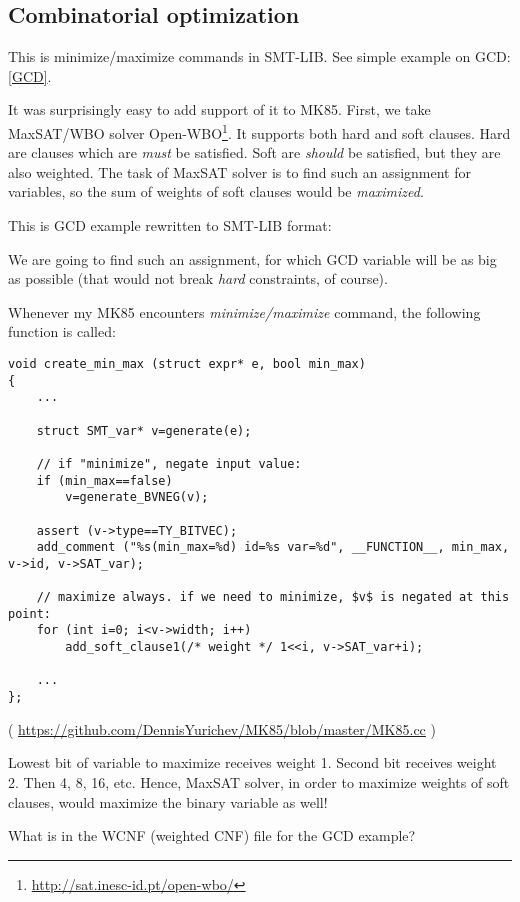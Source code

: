 \subsection{Combinatorial optimization}

This is minimize/maximize commands in SMT-LIB.
See simple example on \ac{GCD}: \ref{GCD}.

It was surprisingly easy to add support of it to MK85.
First, we take MaxSAT/WBO solver Open-WBO\footnote{\url{http://sat.inesc-id.pt/open-wbo/}}.
It supports both hard and soft clauses.
Hard are clauses which are \emph{must} be satisfied.
Soft are \emph{should} be satisfied, but they are also weighted.
The task of MaxSAT solver is to find such an assignment for variables, so the sum of weights of soft clauses would be
\emph{maximized}.

This is GCD example rewritten to SMT-LIB format:



We are going to find such an assignment, for which GCD variable will be as big as possible
(that would not break \emph{hard} constraints, of course).

Whenever my MK85 encounters \emph{minimize/maximize} command, the following function is called:

\begin{lstlisting}[style=customc]
void create_min_max (struct expr* e, bool min_max)
{
	...

	struct SMT_var* v=generate(e);

	// if "minimize", negate input value:
	if (min_max==false)
		v=generate_BVNEG(v);

	assert (v->type==TY_BITVEC);
	add_comment ("%s(min_max=%d) id=%s var=%d", __FUNCTION__, min_max, v->id, v->SAT_var);

	// maximize always. if we need to minimize, $v$ is negated at this point:
	for (int i=0; i<v->width; i++)
		add_soft_clause1(/* weight */ 1<<i, v->SAT_var+i);

	...
};
\end{lstlisting}

( \url{https://github.com/DennisYurichev/MK85/blob/master/MK85.cc} )

Lowest bit of variable to maximize receives weight 1.
Second bit receives weight 2.
Then 4, 8, 16, etc.
Hence, MaxSAT solver, in order to maximize weights of soft clauses, would maximize the binary variable as well!

What is in the WCNF (weighted CNF) file for the GCD example?

